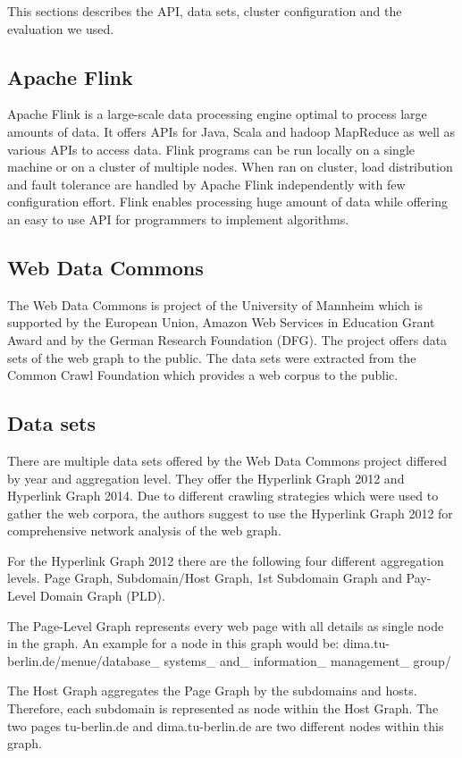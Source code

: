 This sections describes the API, data sets, cluster configuration and the evaluation we used. 

\subsection{Apache Flink}
Apache Flink is a large-scale data processing engine optimal to process large amounts of data. It offers APIs for Java, Scala and hadoop MapReduce as well as various APIs to access data. Flink programs can be run locally on a single machine or on a cluster of multiple nodes. When ran on cluster, load distribution and fault tolerance are handled by Apache Flink independently with few configuration effort. Flink enables processing huge amount of data while offering an easy to use API for programmers to implement algorithms.

\subsection{Web Data Commons}
The Web Data Commons is project of the University of Mannheim which is supported by the European Union, Amazon Web Services in Education Grant Award and by the German Research Foundation (DFG). The project offers data sets of the web graph to the public. The data sets were extracted from the Common Crawl Foundation which provides a web corpus to the public.

\subsection{Data sets}
There are multiple data sets offered by the Web Data Commons project differed by year and aggregation level. They offer the Hyperlink Graph 2012 and Hyperlink Graph 2014. Due to different crawling strategies which were used to gather the web corpora, the authors suggest to use the Hyperlink Graph 2012 for comprehensive network analysis of the web graph.

For the Hyperlink Graph 2012 there are the following four different aggregation levels. Page Graph, Subdomain/Host Graph, 1st Subdomain Graph and Pay-Level Domain Graph (PLD).

The Page-Level Graph represents every web page with all details as single node in the graph. An example for a node in this graph would be: dima.tu-berlin.de/menue/database\_ systems\_ and\_ information\_ management\_ group/

The Host Graph aggregates the Page Graph by the subdomains and hosts. Therefore, each subdomain is represented as node within the Host Graph. The two pages tu-berlin.de and dima.tu-berlin.de are two different nodes within this graph.

